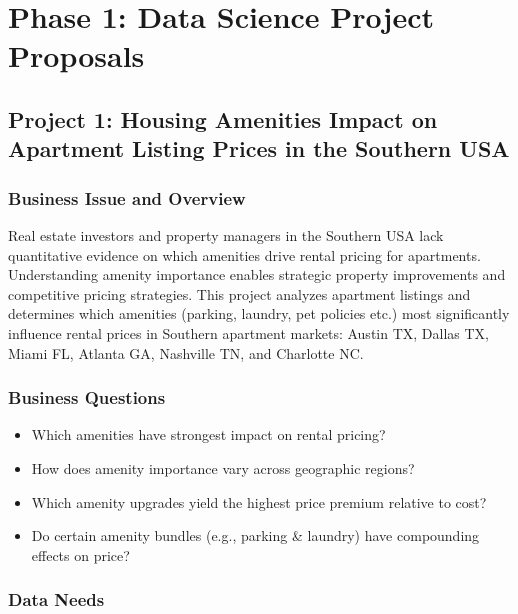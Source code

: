 \section*{Phase 1: Data Science Project Proposals}

\subsection*{Project 1: Housing Amenities Impact on Apartment Listing Prices in the Southern USA}

\subsubsection*{Business Issue and Overview}

Real estate investors and property managers in the Southern USA lack quantitative evidence on which amenities drive rental pricing for apartments. Understanding amenity importance enables strategic property improvements and competitive pricing strategies. This project analyzes apartment listings and determines which amenities (parking, laundry, pet policies etc.) most significantly influence rental prices in %
Southern apartment markets: Austin TX, Dallas TX, Miami FL, Atlanta GA, Nashville TN, and Charlotte NC. %

\subsubsection*{Business Questions}

\begin{itemize} [itemsep = -9pt]
    \item Which amenities have strongest impact on rental pricing?
    \item How does amenity importance vary across geographic regions?
    \item Which amenity upgrades yield the highest price premium relative to cost?
    \item Do certain amenity bundles (e.g., parking \& laundry) have compounding effects on price?
\end{itemize}

\subsubsection*{Data Needs}

